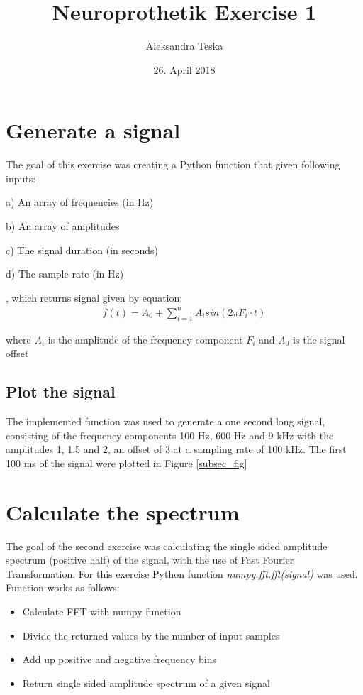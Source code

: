 \documentclass{scrartcl}			%
\title{Neuroprothetik Exercise 1}
\author{Aleksandra Teska}
\date{26. April 2018}
\begin{document}

\maketitle

\section{Generate a signal}		%
The goal of this exercise was creating a Python function that given following inputs:

a) An array of frequencies (in Hz)

b) An array of amplitudes

c) The signal duration (in seconds)

d) The sample rate (in Hz)

, which returns signal given by equation:
\begin{align}
f(t) = A_0 + \sum_{i=1}^{n} A_i sin(2\pi F_i\cdot t)
\end{align}			
 
where $A_{i}$ is the amplitude of the frequency component $F_{i}$  and  $A_{0}$  is the signal offset

\subsection{Plot the signal}		%
The implemented function was used to generate a one second long signal, consisting of the frequency components 100 Hz, 600 Hz and 9 kHz with the amplitudes 1, 1.5 and 2, an offset of 3 at a sampling rate of 100 kHz.
The first 100 ms of the signal were plotted in Figure \ref{subsec_fig}




\section{Calculate the spectrum}
The goal of the second exercise was calculating the single sided amplitude spectrum (positive half) of the signal, with the use of Fast Fourier Transformation. For this exercise Python function \textit{numpy.fft.fft(signal)} was used. Function works as follows:
\begin{itemize}
	\item Calculate FFT with numpy function
	\item Divide the returned values by the number of input samples 
	\item Add up positive and negative frequency bins
	\item Return single sided amplitude spectrum of a given signal
\end{itemize}
\end{document}
